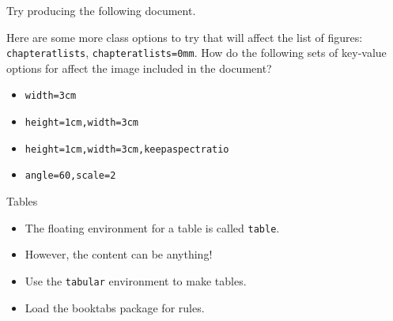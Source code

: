 \begin{exercise}
  Try producing the following document.
  
  Here are some more class options to try that will affect the list of figures: \texttt{chapteratlists}, \texttt{chapteratlists=0mm}.
  How do the following sets of key-value options for  affect the image included in the document?
  \begin{itemize}
    \item \texttt{width=3cm}
    \item \texttt{height=1cm,width=3cm}
    \item \texttt{height=1cm,width=3cm,keepaspectratio}
    \item \texttt{angle=60,scale=2}
  \end{itemize}
\end{exercise}

\begin{frame}{Tables}

  \begin{itemize}
	\item The floating environment for a table is called \texttt{table}.
	\item However, the content can be anything!
	\item Use the \texttt{tabular} environment to make tables.
	\item Load the \textsf{booktabs} package for rules.
  \end{itemize}

\end{frame}

